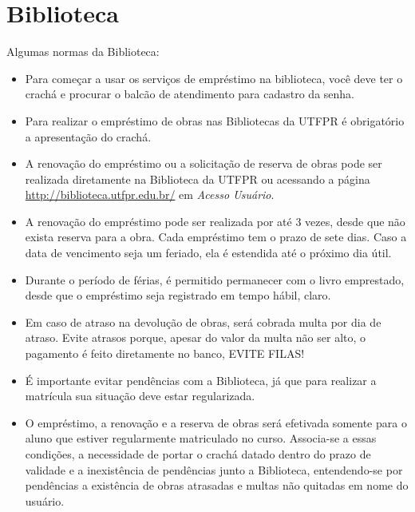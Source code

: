 \documentclass[a4paper,12pt,openany]{article}
\begin{document}
\newpage
\section{Biblioteca}

Algumas normas da Biblioteca:

\begin{itemize}

\item Para começar a usar os serviços de empréstimo na biblioteca, você deve ter o crachá e procurar o balcão de atendimento para cadastro da senha.

\item Para realizar o empréstimo de obras nas Bibliotecas da UTFPR é obrigatório a apresentação do crachá.

\item A renovação do empréstimo ou a solicitação de reserva de obras pode ser realizada diretamente na Biblioteca da UTFPR ou acessando a página \url{http://biblioteca.utfpr.edu.br/} em \textit{Acesso Usuário}.  

\item A renovação do empréstimo pode ser realizada por até 3 vezes, desde que não exista reserva para a obra. Cada empréstimo tem o prazo de sete dias. Caso a data de vencimento seja um feriado, ela é estendida até o próximo dia útil.

\item Durante o período de férias, é permitido permanecer com o livro emprestado, desde que o empréstimo seja registrado em tempo hábil, claro.

\item Em caso de atraso na devolução de obras, será cobrada multa por dia de atraso. Evite atrasos porque, apesar do valor da multa não ser alto, o pagamento é feito diretamente no banco, EVITE FILAS!

\item É importante evitar pendências com a Biblioteca, já que para realizar a matrícula sua situação deve estar regularizada.

\item O empréstimo, a renovação e a reserva de obras será efetivada somente para o aluno que estiver regularmente matriculado no curso. Associa-se a essas  condições, a necessidade de portar o crachá datado dentro do prazo de validade e a inexistência de pendências junto a Biblioteca, entendendo-se por pendências a  existência de obras atrasadas e multas não quitadas em nome do usuário. 

\end{itemize}
\end{document}
